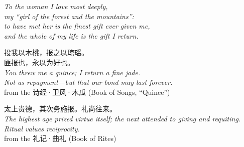 \documentclass[11pt,a4paper]{article}
\newcommand{\zh}[1]{{\cjkfont #1}}
\begin{document}
\thispagestyle{empty}
\null\vspace{3.5cm}
\begin{center}
\itshape
To the woman I love most deeply,\\
my ``girl of the forest and the mountains'':\\[4pt]
to have met her is the finest gift ever given me,\\
and the whole of my life is the gift I return.
\end{center}
\vspace{2.2cm}
\begin{center}
\zh{投我以木桃，报之以琼瑶。}\\
\zh{匪报也，永以为好也。}\\[6pt]
{\itshape You threw me a quince; I return a fine jade.\\
Not as repayment---but that our bond may last forever.}\\[4pt]
{\small from the \zh{诗经·卫风·木瓜} (Book of Songs, ``Quince'')}
\end{center}
\vspace{1.6cm}
\begin{center}
\zh{太上贵德，其次务施报。礼尚往来。}\\[6pt]
{\itshape The highest age prized virtue itself; the next attended to giving and
requiting.\\ Ritual values reciprocity.}\\[4pt]
{\small from the \zh{礼记·曲礼} (Book of Rites)}
\end{center}
\vfill
\clearpage
\end{document}
